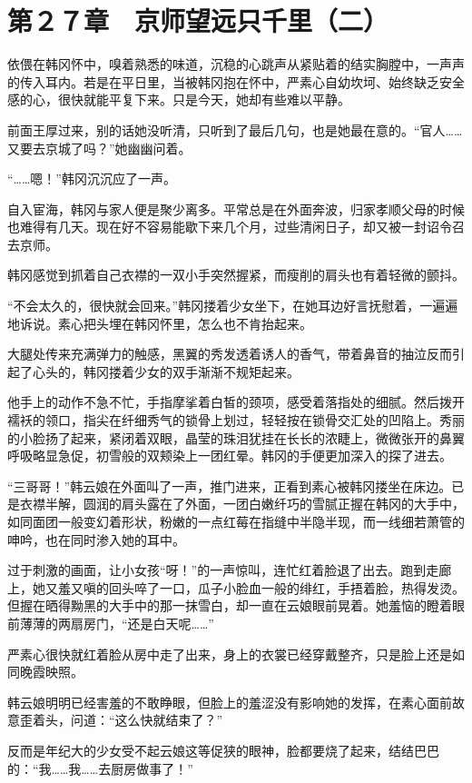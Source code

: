 \section{第２７章　京师望远只千里（二） }

依偎在韩冈怀中，嗅着熟悉的味道，沉稳的心跳声从紧贴着的结实胸膛中，一声声的传入耳内。若是在平日里，当被韩冈抱在怀中，严素心自幼坎坷、始终缺乏安全感的心，很快就能平复下来。只是今天，她却有些难以平静。

前面王厚过来，别的话她没听清，只听到了最后几句，也是她最在意的。“官人……又要去京城了吗？”她幽幽问着。

“……嗯！”韩冈沉沉应了一声。

自入宦海，韩冈与家人便是聚少离多。平常总是在外面奔波，归家孝顺父母的时候也难得有几天。现在好不容易能歇下来几个月，过些清闲日子，却又被一封诏令召去京师。

韩冈感觉到抓着自己衣襟的一双小手突然握紧，而瘦削的肩头也有着轻微的颤抖。

“不会太久的，很快就会回来。”韩冈搂着少女坐下，在她耳边好言抚慰着，一遍遍地诉说。素心把头埋在韩冈怀里，怎么也不肯抬起来。

大腿处传来充满弹力的触感，黑翼的秀发透着诱人的香气，带着鼻音的抽泣反而引起了心头的，韩冈搂着少女的双手渐渐不规矩起来。

他手上的动作不急不忙，手指摩挲着白皙的颈项，感受着落指处的细腻。然后拨开襦袄的领口，指尖在纤细秀气的锁骨上划过，轻轻按在锁骨交汇处的凹陷上。秀丽的小脸扬了起来，紧闭着双眼，晶莹的珠泪犹挂在长长的浓睫上，微微张开的鼻翼呼吸略显急促，初雪般的双颊染上一团红晕。韩冈的手便更加深入的探了进去。

“三哥哥！”韩云娘在外面叫了一声，推门进来，正看到素心被韩冈搂坐在床边。已是衣襟半解，圆润的肩头露在了外面，一团白嫩纤巧的雪腻正握在韩冈的大手中，如同面团一般变幻着形状，粉嫩的一点红莓在指缝中半隐半现，而一线细若萧管的呻吟，也在同时渗入她的耳中。

过于刺激的画面，让小女孩“呀！”的一声惊叫，连忙红着脸退了出去。跑到走廊上，她又羞又嗔的回头啐了一口，瓜子小脸血一般的绯红，手捂着脸，热得发烫。但握在晒得黝黑的大手中的那一抹雪白，却一直在云娘眼前晃着。她羞恼的瞪着眼前薄薄的两扇房门，“还是白天呢……”

严素心很快就红着脸从房中走了出来，身上的衣裳已经穿戴整齐，只是脸上还是如同晚霞映照。

韩云娘明明已经害羞的不敢睁眼，但脸上的羞涩没有影响她的发挥，在素心面前故意歪着头，问道：“这么快就结束了？”

反而是年纪大的少女受不起云娘这等促狭的眼神，脸都要烧了起来，结结巴巴的：“我……我……去厨房做事了！”

